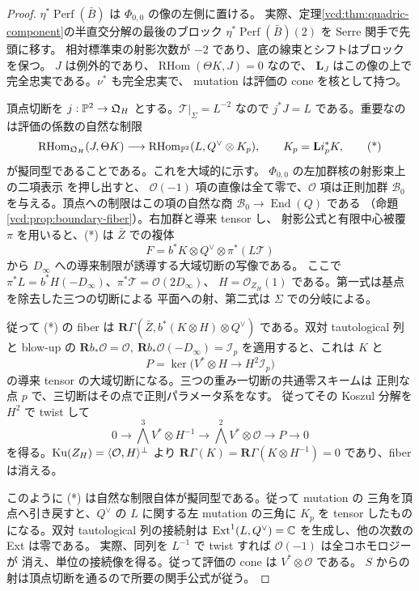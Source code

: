 \begin{proof}
$\eta^*\operatorname{Perf}(\bar B)$ は $\Phi_{0,0}$ の像の左側に置ける。
実際、定理\ref{vcd:thm:quadric-component}の半直交分解の最後のブロック
$\eta^*\operatorname{Perf}(\bar B)(2)$ を Serre 関手で先頭に移す。
相対標準束の射影次数が $-2$ であり、底の線束とシフトはブロックを保つ。
$J$ は例外的であり、$\operatorname{RHom}(\Theta K,J)=0$ なので、
$\mathbf L_J$ はこの像の上で完全忠実である。$\nu^*$ も完全忠実で、
mutation は評価の cone を核として持つ。

頂点切断を $j:\mathbb P^2\to\mathfrak Q_H$ とする。$\mathcal T|_\Sigma=L^{-2}$
なので $j^*J=L$ である。重要なのは評価の係数の自然な制限
\[
 \operatorname{RHom}_{\mathfrak Q_H}(J,\Theta K)\longrightarrow
 \operatorname{RHom}_{\mathbb P^2}(L,Q^\vee\otimes K_p),\qquad K_p={\bf L}i_p^*K ,
 \tag{*}
\]
が擬同型であることである。これを大域的に示す。
$\Phi_{0,0}$ の左加群核の射影束上の二項表示
\cite[Lemmas~4.5, 4.7, Remark~4.8]{NFMKuznetsovQuadric}を押し出すと、
$\mathcal O(-1)$ 項の直像は全て零で、$\mathcal O$ 項は正則加群
$\mathcal B_0$ を与える。頂点への制限はこの項の自然な商
$\mathcal B_0\to\operatorname{End}(Q)$ である
（命題\ref{vcd:prop:boundary-fiber}）。右加群と導来 tensor し、
射影公式と有限中心被覆 $\pi$ を用いると、(*) は $\bar Z$ での複体
\[
 F=b^*K\otimes Q^\vee\otimes \pi^*(L\mathcal T)
\]
から $D_\infty$ への導来制限が誘導する大域切断の写像である。
ここで $\pi^*L=b^*H(-D_\infty)$、$\pi^*\mathcal T=\mathcal O(2D_\infty)$、
$H=\mathcal O_{Z_H}(1)$ である。第一式は基点を除去した三つの切断による
平面への射、第二式は $\Sigma$ での分岐による。

従って (*) の fiber は $\mathbf R\Gamma(\bar Z,b^*(K\otimes H)\otimes Q^\vee)$
である。双対 tautological 列と blow-up の
$\mathbf R b_*\mathcal O=\mathcal O,\ \mathbf R b_*\mathcal O(-D_\infty)=\mathcal I_p$
を適用すると、これは $K$ と
\[
 P=\ker\big(V^*\otimes H\longrightarrow H^2\mathcal I_p\big)
\]
の導来 tensor の大域切断になる。三つの重み一切断の共通零スキームは
正則な点 $p$ で、三切断はその点で正則パラメータ系をなす。
従ってその Koszul 分解を $H^2$ で twist して
\[
 0\longrightarrow \bigwedge^3 V^*\otimes H^{-1}\longrightarrow
    \bigwedge^2 V^*\otimes\mathcal O\longrightarrow P\longrightarrow0
\]
を得る。$\operatorname{Ku}(Z_H)=\langle\mathcal O,H\rangle^\perp$ より
$\mathbf R\Gamma(K)=\mathbf R\Gamma(K\otimes H^{-1})=0$ であり、fiber は消える。

このように (*) は自然な制限自体が擬同型である。従って mutation の
三角を頂点へ引き戻すと、$Q^\vee$ の $L$ に関する左 mutation の三角に
$K_p$ を tensor したものになる。双対 tautological 列の接続射は
$\operatorname{Ext}^1(L,Q^\vee)=\mathbb C$ を生成し、他の次数の Ext は零である。
実際、同列を $L^{-1}$ で twist すれば $\mathcal O(-1)$ は全コホモロジーが
消え、単位の接続像を得る。従って評価の cone は $V^*\otimes\mathcal O$ である。
$S$ からの射は頂点切断を通るので所要の関手公式が従う。
\end{proof}

